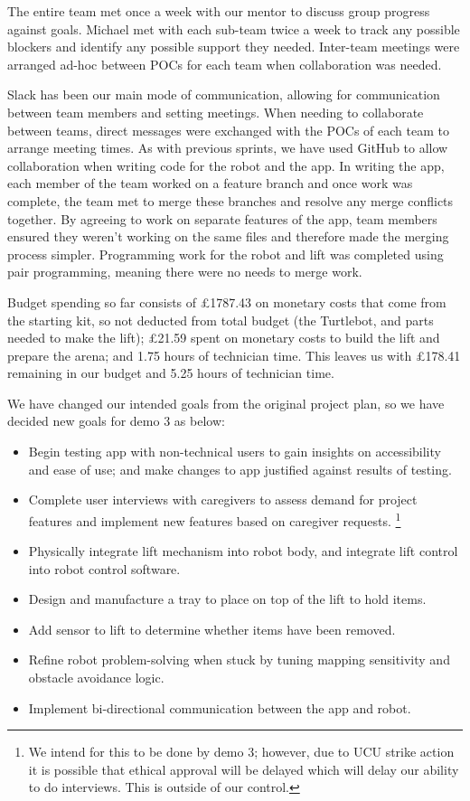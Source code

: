 \documentclass{article}
\begin{document}
The entire team met once a week with our mentor to discuss group progress against goals. Michael met with each sub-team twice a week to track any possible blockers and identify any possible support they needed. Inter-team meetings were arranged ad-hoc between POCs for each team when collaboration was needed. 

Slack has been our main mode of communication, allowing for communication between team members and setting meetings. When needing to collaborate between teams, direct messages were exchanged with the POCs of each team to arrange meeting times. As with previous sprints, we have used GitHub to allow collaboration when writing code for the robot and the app. In writing the app, each member of the team worked on a feature branch and once work was complete, the team met to merge these branches and resolve any merge conflicts together. By agreeing to work on separate features of the app, team members ensured they weren't working on the same files and therefore made the merging process simpler. Programming work for the robot and lift was completed using pair programming, meaning there were no needs to merge work.

Budget spending so far consists of \pounds 1787.43 on monetary costs that come from the starting kit, so not deducted from total budget (the Turtlebot, and parts needed to make the lift); \pounds 21.59 spent on monetary costs to build the lift and prepare the arena; and 1.75 hours of technician time. This leaves us with \pounds 178.41 remaining in our budget and 5.25 hours of technician time. 

We have changed our intended goals from the original project plan, so we have decided new goals for demo 3 as below:
\begin{itemize}
\item Begin testing app with non-technical users to gain insights on accessibility and ease of use; and make changes to app justified against results of testing.
\item Complete user interviews with caregivers to assess demand for project features and implement new features based on caregiver requests. \footnote{We intend for this to be done by demo 3; however, due to UCU strike action it is possible that ethical approval will be delayed which will delay our ability to do interviews. This is outside of our control.}
\item Physically integrate lift mechanism into robot body, and integrate lift control into robot control software.
\item Design and manufacture a tray to place on top of the lift to hold items.
\item Add sensor to lift to determine whether items have been removed. 
\item Refine robot problem-solving when stuck by tuning mapping sensitivity and obstacle avoidance logic.
\item Implement bi-directional communication between the app and robot.
\end{itemize}
\end{document}
